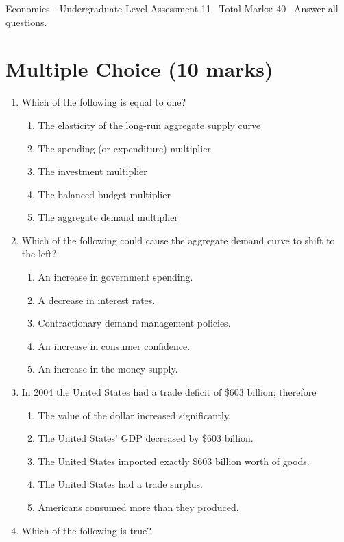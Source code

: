 \documentclass[12pt]{article}
\begin{document}
\begin{center}
Economics - Undergraduate Level Assessment 11 \
Total Marks: 40 \
Answer all questions.
\end{center}

\section*{Multiple Choice (10 marks)}
\begin{enumerate}[label=\arabic*.]
\item Which of the following is equal to one?
\begin{enumerate}[label=(\alph*)]
    \item The elasticity of the long-run aggregate supply curve
    \item The spending (or expenditure) multiplier
    \item The investment multiplier
    \item The balanced budget multiplier
    \item The aggregate demand multiplier
\end{enumerate}
\item Which of the following could cause the aggregate demand curve to shift to the left?
\begin{enumerate}[label=(\alph*)]
    \item An increase in government spending.
    \item A decrease in interest rates.
    \item Contractionary demand management policies.
    \item An increase in consumer confidence.
    \item An increase in the money supply.
\end{enumerate}
\item In 2004 the United States had a trade deficit of \$603 billion; therefore
\begin{enumerate}[label=(\alph*)]
    \item The value of the dollar increased significantly.
    \item The United States' GDP decreased by \$603 billion.
    \item The United States imported exactly \$603 billion worth of goods.
    \item The United States had a trade surplus.
    \item Americans consumed more than they produced.
\end{enumerate}
\item Which of the following is true?

\end{enumerate}
\end{document}
